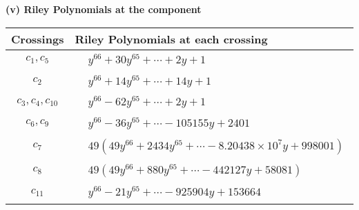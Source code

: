 \documentclass[1p]{elsarticle_modified}
\theoremstyle{definition}
\begin{document}
\flushleft \textbf{(v) Riley Polynomials at the component}\newline \\
\begin{tabular}{m{50pt}|m{274pt}}
Crossings & \hspace{64pt}Riley Polynomials at each crossing \\
\hline $$\begin{aligned}c_{1},c_{5}\end{aligned}$$&$\begin{aligned}
&y^{66}+30 y^{65}+\cdots+2 y+1
\end{aligned}$\\
\hline $$\begin{aligned}c_{2}\end{aligned}$$&$\begin{aligned}
&y^{66}+14 y^{65}+\cdots+14 y+1
\end{aligned}$\\
\hline $$\begin{aligned}c_{3},c_{4},c_{10}\end{aligned}$$&$\begin{aligned}
&y^{66}-62 y^{65}+\cdots+2 y+1
\end{aligned}$\\
\hline $$\begin{aligned}c_{6},c_{9}\end{aligned}$$&$\begin{aligned}
&y^{66}-36 y^{65}+\cdots-105155 y+2401
\end{aligned}$\\
\hline $$\begin{aligned}c_{7}\end{aligned}$$&$\begin{aligned}
&49(49 y^{66}+2434 y^{65}+\cdots-8.20438\times10^{7} y+998001)
\end{aligned}$\\
\hline $$\begin{aligned}c_{8}\end{aligned}$$&$\begin{aligned}
&49(49 y^{66}+880 y^{65}+\cdots-442127 y+58081)
\end{aligned}$\\
\hline $$\begin{aligned}c_{11}\end{aligned}$$&$\begin{aligned}
&y^{66}-21 y^{65}+\cdots-925904 y+153664
\end{aligned}$\\
\hline
\end{tabular}\\~\\
\end{document}

